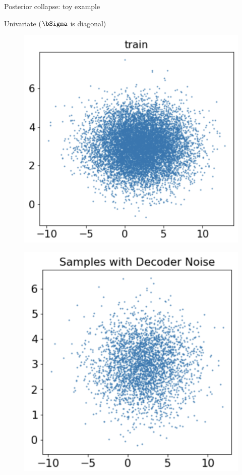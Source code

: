 \begin{frame}{Posterior collapse: toy example}
	\begin{block}{Univariate ($\bSigma$ is diagonal)}
		\vspace{-0.5cm}
		\begin{minipage}[t]{0.33\columnwidth}
			\begin{figure}[h]
				\centering
				\includegraphics[width=.8\linewidth]{figs/posterior_collapse_toy_2.png}
			\end{figure}
		\end{minipage}%
		\begin{minipage}[t]{0.33\columnwidth}
			\begin{figure}[h]
				\centering
				\includegraphics[width=.75\linewidth]{figs/posterior_collapse_toy_4.png}

\end{figure}
\end{minipage}
\end{block}
\end{frame}
